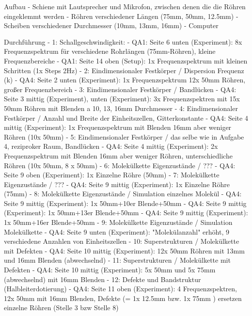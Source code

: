 Aufbau
- Schiene mit Lautsprecher und Mikrofon, zwischen denen die die Röhren eingeklemmt werden
- Röhren verschiedener Längen (75mm, 50mm, 12.5mm)
- Scheiben verschiedener Durchmesser (10mm, 13mm, 16mm)
- Computer

Durchführung
- 1: Schallgeschwindigkeit:
    - QA1: Seite 6 unten (Experiment): 8x Frequenzspektrum für verschiedene Rohrlängen (75mm-Röhren), kleine Frequenzbereiche
    - QA1: Seite 14 oben (Setup): 1x Frequenzspektrum mit kleinen Schritten (1x Steps 2Hz)
- 2: Eindimensionaler Festkörper / Dispersion Frequenz (k)
    - QA4: Seite 2 unten (Experiment): 1x Frequenzspektrum 12x 50mm Röhren, großer Frequenzbereich
- 3: Eindimensionaler Festkörper / Bandlücken
    - QA4: Seite 3 mittig (Experiment), unten (Experiment): 3x Frequenzspektren mit 15x 50mm Röhren mit Blenden a 10, 13, 16mm Durchmesser
- 4: Eindimensionaler Festkörper / Anzahl und Breite der Einheitszellen, Gitterkonstante
    - QA4: Seite 4 mittig (Experiment): 1x Frequenzspektrum mit Blenden 16mm aber weniger Röhren (10x 50mm)
- 5: Eindimensionaler Festkörper / das selbe wie in Aufgabe 4, reziproker Raum, Bandlücken
    - QA4: Seite 4 mittig (Experiment): 2x Frequenzspektrum mit Blenden 16mm aber weniger Röhren, unterschiedliche Röhren (10x 50mm, 8 x 50mm)
- 6: Molekülkette Eigenzustände / ???
    - QA4: Seite 9 oben (Experiment): 1x Einzelne Röhre (50mm)
- 7: Molekülkette Eigenzustände / ???
    - QA4: Seite 9 mittig (Experiment): 1x Einzelne Röhre (75mm)
- 8: Molekülkette Eigenzustände / Simulation einzelnes Molekül
    - QA4: Seite 9 mittig (Experiment): 1x 50mm+10er Blende+50mm
    - QA4: Seite 9 mittig (Experiment): 1x 50mm+13er Blende+50mm
    - QA4: Seite 9 mittig (Experiment): 1x 50mm+16er Blende+50mm
- 9: Molekülkette Eigenzustände / Simulation Molekülkette
    - QA4: Seite 9 unten (Experiment): "Molekülanzahl" erhöht, 9 verschiedene Anzahlen von Einheitszellen
- 10: Superstrukturen / Molekülkette mit Defekten
    - QA4: Seite 10 mittig (Experiment): 12x 50mm Röhren mit 13mm und 16mm Blenden (abwechselnd)
- 11: Superstrukturen / Molekülkette mit Defekten
    - QA4: Seite 10 mittig (Experiment): 5x 50mm und 5x 75mm (abwechselnd) mit 16mm Blenden
- 12: Defekte und Bandstruktur (Halbleiterdotierung)
    - QA4: Seite 11 oben (Experiment): 4 Frequenzspektren, 12x 50mm mit 16mm Blenden, Defekte (= 1x 12.5mm bzw. 1x 75mm ) ersetzen einzelne Röhren (Stelle 3 bzw Stelle 8)
